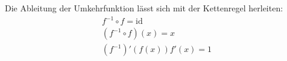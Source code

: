 Die Ableitung der Umkehrfunktion lässt sich mit der Kettenregel herleiten:
\begin{align}
    f^{-1} \circ f = \text{id} \\
    \left( f^{-1} \circ f \right) (x) = x \\
    (f^{-1})'(f(x)) f'(x) = 1
\end{align}